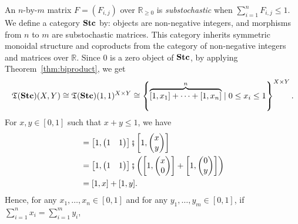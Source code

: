 An $n$-by-$m$ matrix $F=(F_{i,j})$ over $\mathbb{R}_{\geq 0}$ is
\emph{substochastic} when $\sum_{i=1}^{n}F_{i,j} \leq 1$. We define
a category $\mathbf{Stc}$ by: objects are non-negative integers, and
morphisms from $n$ to $m$ are substochastic matrices.
This category inherits symmetric monoidal structure
and coproducts from the category of non-negative integers
and matrices over $\mathbb{R}$. Since $0$ is a zero object
of $\mathbf{Stc}$, by applying Theorem~\ref{thm:biproduct}, we get
\begin{equation*}
  \mathfrak{T}(\mathbf{Stc})(X,Y) \cong
  \mathfrak{T}(\mathbf{Stc})(1,1)^{X \times Y}
  \cong \left\{\overbrace{[1,x_{1}] + \cdots + [1,x_{n}]}^{n}
    \mid 0 \leq x_{i} \leq 1 \right\}^{X \times Y}.
\end{equation*}
For $x,y \in [0,1]$ such that $x+y \leq 1$, we have
\begin{align*}
  [1,x + y]
  &= \left[1,
    \begin{pmatrix}
      1 & 1 \\
    \end{pmatrix}\right]
  \fatsemi
  \left[1,
  \begin{pmatrix}
    x \\
    y \\
  \end{pmatrix}
  \right] \\
  &= \left[1,
    \begin{pmatrix}
      1 & 1 \\
    \end{pmatrix}\right]
  \fatsemi
  \left(
  \left[1,
  \begin{pmatrix}
    x \\
    0 \\
  \end{pmatrix}
  \right] +
  \left[1,
  \begin{pmatrix}
    0 \\
    y \\
  \end{pmatrix}
  \right]\right)\\
  &= [1,x] + [1,y].
\end{align*}
Hence, for any $x_{1},\ldots,x_{n} \in [0,1]$
and for any $y_{1},\ldots,y_{m} \in [0,1]$,
if $\sum_{i = 1}^{n}x_{i} = \sum_{i = 1}^{m}y_{i}$,
